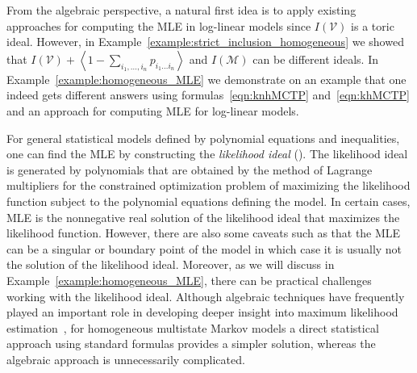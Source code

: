 \documentclass[11pt, a4paper]{article}
\numberwithin{equation}{section}
\theoremstyle{plain}
\theoremstyle{definition}
\renewcommand{\emph}[1]{\textit{#1}}
\begin{document}
From the algebraic perspective, a natural first idea is to apply existing approaches for computing the MLE in log-linear models since $I(\mathcal{V})$ is a toric ideal. However, in Example~\ref{example:strict_inclusion_homogeneous} we showed that $I(\mathcal{V}) + \left\langle 1-\sum_{i_1,\ldots, i_n}p_{i_1\ldots i_n} \right\rangle$ and $I(\mathcal{M})$ can be different ideals. In Example~\ref{example:homogeneous_MLE} we demonstrate on an example that one indeed gets different answers using formulas~\eqref{eqn:knhMCTP}  and~\eqref{eqn:khMCTP} and an approach for computing MLE for log-linear models.

For general statistical models defined by polynomial equations and inequalities, one can find the MLE by constructing the \emph{likelihood ideal} (\cite[Algorithm 7.2.4]{sullivant2023algebraic}). The likelihood ideal is generated by polynomials that are obtained by the method of Lagrange multipliers for the constrained optimization problem of maximizing the likelihood function subject to the polynomial equations defining the model. In certain cases, MLE is the nonnegative real solution of the likelihood ideal that maximizes the likelihood function. However, there are also some caveats such as that the MLE can be a singular or boundary point of the model in which case it is usually not the solution of the likelihood ideal. Moreover, as we will discuss in Example~\ref{example:homogeneous_MLE}, there can be practical challenges working with the likelihood ideal.  Although algebraic techniques have frequently played an important role in developing deeper insight into maximum likelihood estimation~\cite{kubjas2015fixed}, for homogeneous multistate Markov models a direct statistical approach using standard formulas provides a simpler solution, whereas the algebraic approach is unnecessarily complicated.
\end{document}

